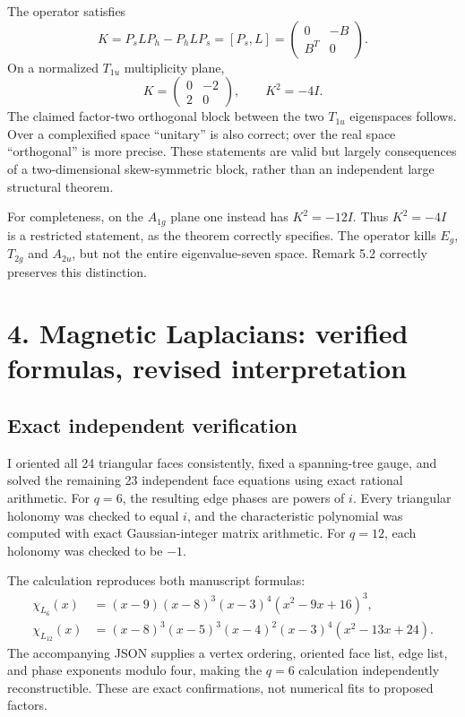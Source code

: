 \documentclass[11pt,a4paper]{article}
\begin{document}
The operator satisfies
\[
 K=P_sLP_h-P_hLP_s=[P_s,L]
   =\begin{pmatrix}0&-B\\B^T&0\end{pmatrix}.
\]
On a normalized $T_{1u}$ multiplicity plane,
\[
 K=\begin{pmatrix}0&-2\\2&0\end{pmatrix},\qquad K^2=-4I.
\]
The claimed factor-two orthogonal block between the two $T_{1u}$ eigenspaces follows. Over a complexified space ``unitary'' is also correct; over the real space ``orthogonal'' is more precise. These statements are valid but largely consequences of a two-dimensional skew-symmetric block, rather than an independent large structural theorem.

For completeness, on the $A_{1g}$ plane one instead has $K^2=-12I$. Thus $K^2=-4I$ is a restricted statement, as the theorem correctly specifies. The operator kills $E_g$, $T_{2g}$ and $A_{2u}$, but not the entire eigenvalue-seven space. Remark 5.2 correctly preserves this distinction.

\section*{4. Magnetic Laplacians: verified formulas, revised interpretation}
\subsection*{Exact independent verification}
I oriented all 24 triangular faces consistently, fixed a spanning-tree gauge, and solved the remaining 23 independent face equations using exact rational arithmetic. For $q=6$, the resulting edge phases are powers of $i$. Every triangular holonomy was checked to equal $i$, and the characteristic polynomial was computed with exact Gaussian-integer matrix arithmetic. For $q=12$, each holonomy was checked to be $-1$.

The calculation reproduces both manuscript formulas:
\begin{align}
\chi_{L_6}(x)&=(x-9)(x-8)^3(x-3)^4(x^2-9x+16)^3,\\
\chi_{L_{12}}(x)&=(x-8)^3(x-5)^3(x-4)^2(x-3)^4(x^2-13x+24).
\end{align}
The accompanying JSON supplies a vertex ordering, oriented face list, edge list, and phase exponents modulo four, making the $q=6$ calculation independently reconstructible. These are exact confirmations, not numerical fits to proposed factors.
\end{document}
